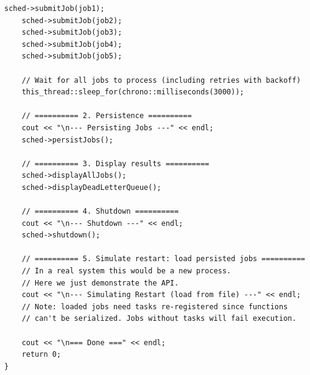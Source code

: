 \documentclass[11pt,a4paper]{article}
\begin{document}
\begin{lstlisting}[title={\texttt{main.cpp}}]
    sched->submitJob(job1);
    sched->submitJob(job2);
    sched->submitJob(job3);
    sched->submitJob(job4);
    sched->submitJob(job5);

    // Wait for all jobs to process (including retries with backoff)
    this_thread::sleep_for(chrono::milliseconds(3000));

    // ========== 2. Persistence ==========
    cout << "\n--- Persisting Jobs ---" << endl;
    sched->persistJobs();

    // ========== 3. Display results ==========
    sched->displayAllJobs();
    sched->displayDeadLetterQueue();

    // ========== 4. Shutdown ==========
    cout << "\n--- Shutdown ---" << endl;
    sched->shutdown();

    // ========== 5. Simulate restart: load persisted jobs ==========
    // In a real system this would be a new process.
    // Here we just demonstrate the API.
    cout << "\n--- Simulating Restart (load from file) ---" << endl;
    // Note: loaded jobs need tasks re-registered since functions
    // can't be serialized. Jobs without tasks will fail execution.

    cout << "\n=== Done ===" << endl;
    return 0;
}
\end{lstlisting}
\end{document}
